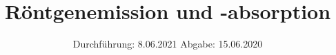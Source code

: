 

\subject{Versuch Nr.V602}
\title{Röntgenemission und -absorption}
\date{%
  Durchführung: 8.06.2021
  \hspace{3em}
  Abgabe: 15.06.2020
}



\maketitle
\thispagestyle{empty}
\tableofcontents
\newpage 








\nocite{*}

\printbibliography{}


